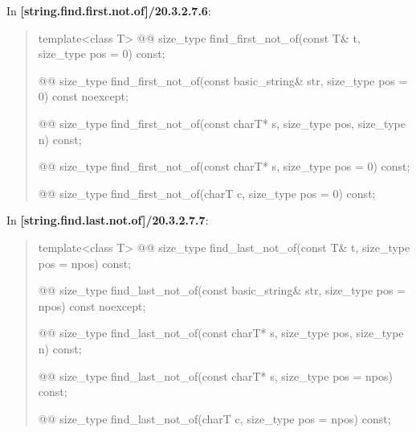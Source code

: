 \documentclass{wg21}
\begin{document}
In \textbf{[string.find.first.not.of]/20.3.2.7.6}:
\begin{quote}
\begin{itemdecl}
template<class T>
  @@ size_type find_first_not_of(const T& t, size_type pos = 0) const;
\end{itemdecl}

\begin{itemdecl}
@@ size_type find_first_not_of(const basic_string& str, size_type pos = 0) const noexcept;
\end{itemdecl}

\begin{itemdecl}
@@ size_type find_first_not_of(const charT* s, size_type pos, size_type n) const;
\end{itemdecl}

\begin{itemdecl}
@@ size_type find_first_not_of(const charT* s, size_type pos = 0) const;
\end{itemdecl}

\begin{itemdecl}
@@ size_type find_first_not_of(charT c, size_type pos = 0) const;
\end{itemdecl}
\end{quote}

In \textbf{[string.find.last.not.of]/20.3.2.7.7}:
\begin{quote}
\begin{itemdecl}
template<class T>
  @@
  size_type find_last_not_of(const T& t, size_type pos = npos) const;
\end{itemdecl}

\begin{itemdecl}
@@ size_type find_last_not_of(const basic_string& str, size_type pos = npos) const noexcept;
\end{itemdecl}

\begin{itemdecl}
@@ size_type find_last_not_of(const charT* s, size_type pos, size_type n) const;
\end{itemdecl}

\begin{itemdecl}
@@ size_type find_last_not_of(const charT* s, size_type pos = npos) const;
\end{itemdecl}

\begin{itemdecl}
@@ size_type find_last_not_of(charT c, size_type pos = npos) const;
\end{itemdecl}
\end{quote}
\end{document}
